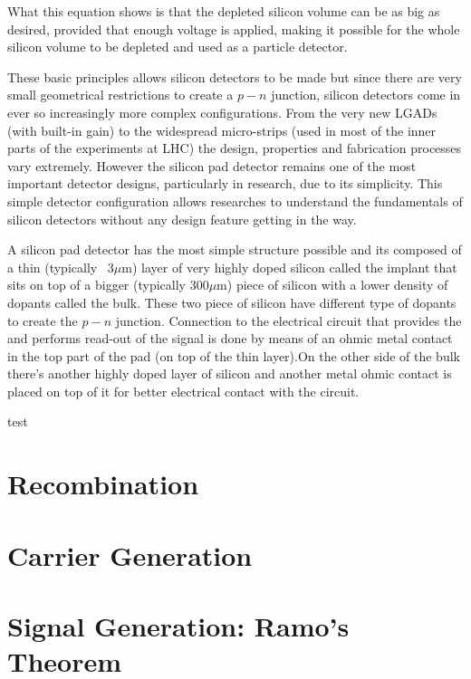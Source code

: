 What this equation shows is that the depleted silicon volume can be as big as desired, provided that enough voltage is applied, making it possible for the whole silicon volume to be depleted and used as a particle detector. 

These basic principles allows silicon detectors to be made but since there are very small geometrical restrictions to create a $p-n$ junction, silicon detectors come in ever so increasingly more complex configurations. From the very new LGADs (with built-in gain) to the widespread micro-strips (used in most of the inner parts of the experiments at LHC) the design, properties and fabrication processes vary extremely. However the silicon pad detector remains one of the most important detector designs, particularly in research, due to its simplicity. This simple detector configuration allows researches to understand the fundamentals of silicon detectors without any design feature getting in the way. 

A silicon pad detector has the most simple structure possible and its composed of a thin (typically ~3$\mu$m) layer of very highly doped silicon called the implant that sits on top of a bigger (typically 300$\mu$m) piece of silicon with a lower density of dopants called the bulk. These two piece of silicon have different type of dopants to create the $p-n$ junction. Connection to the electrical circuit that provides the \vias and performs read-out of the signal is done by means of an ohmic metal contact in the top part of the pad (on top of the thin layer).On the other side of the bulk there's another highly doped layer of silicon and another metal ohmic contact is placed on top of it for better electrical contact with the circuit.

test




\section{Recombination} 

\section{Carrier Generation}

\section{Signal Generation: Ramo's Theorem} %


